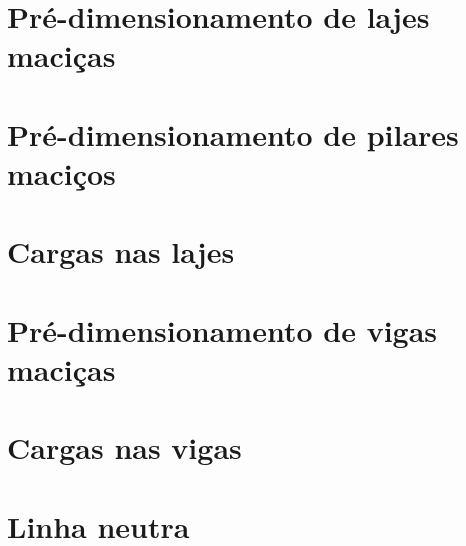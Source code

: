 \documentclass[12pt, a4paper]{article}
\begin{document}
	

	\section{Pré-dimensionamento de lajes maciças}
	

	\section{Pré-dimensionamento de pilares maciços}
	

	\section{Cargas nas lajes}
		

	\section{Pré-dimensionamento de vigas maciças}
	

	\section{Cargas nas vigas}
	

	\section{Linha neutra}
	
\end{document}
